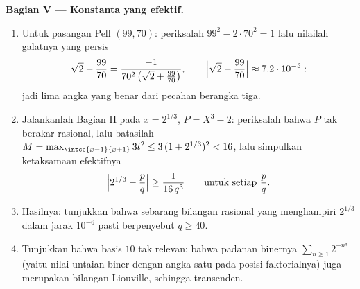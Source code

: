 \begin{problem}
\medskip
\noindent\textbf{Bagian V --- Konstanta yang efektif.}
\begin{enumerate}[resume]
  \item Untuk pasangan Pell $(99, 70)$: periksalah $99^2 - 2\cdot70^2
        = 1$ lalu nilailah galatnya yang persis
        \[
        \sqrt2 - \frac{99}{70}
        = \frac{-1}{70^2\,\bigl(\sqrt2 + \frac{99}{70}\bigr)},
        \qquad
        \Bigl|\sqrt 2 - \frac{99}{70}\Bigr| \approx 7.2\cdot
        10^{-5} :
        \]
        jadi lima angka yang benar dari pecahan berangka tiga.
  \item Jalankanlah Bagian II pada $x = 2^{1/3}$, $P = X^3 - 2$: periksalah bahwa $P$
        tak berakar rasional, lalu batasilah $M = \max_{\intcc{x-1}{x+1}}
        3t^2 \leq 3\,(1 + 2^{1/3})^2 < 16$, lalu simpulkan
        ketaksamaan efektifnya
        \[
        \Bigl| 2^{1/3} - \frac pq \Bigr| \geq
        \frac{1}{16\,q^3} \qquad \text{untuk setiap } \frac pq .
        \]
  \item Hasilnya: tunjukkan bahwa sebarang bilangan rasional yang menghampiri $2^{1/3}$
        dalam jarak $10^{-6}$ pasti berpenyebut $q \geq 40$.
  \item Tunjukkan bahwa basis $10$ tak relevan: bahwa padanan
        binernya $\sum_{n\geq1} 2^{-n!}$ (yaitu nilai untaian
        biner dengan angka satu pada posisi faktorialnya) juga merupakan
        bilangan Liouville, sehingga transenden.
\end{enumerate}


\end{problem}
